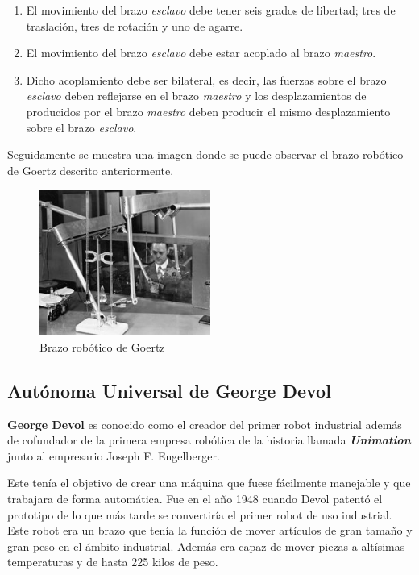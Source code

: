 \begin{enumerate}
\item El movimiento del brazo \textit{esclavo} debe tener seis grados de libertad; tres de traslación, tres de rotación y uno de agarre.

\item El movimiento del brazo \textit{esclavo} debe estar acoplado al brazo \textit{maestro}.

\item Dicho acoplamiento debe ser bilateral, es decir, las fuerzas sobre el brazo \textit{esclavo} deben reflejarse en el brazo \textit{maestro} y los desplazamientos de producidos por el brazo \textit{maestro} deben producir el mismo desplazamiento sobre el brazo \textit{esclavo}.

\end{enumerate}


Seguidamente se muestra una imagen donde se puede observar el brazo robótico de Goertz descrito anteriormente.



\begin{figure}[H]
\begin{center}
  \includegraphics[width=0.5\textwidth]{./EtapaPrimeriza/imagenes/brazo.jpg}
  \caption{Brazo robótico de Goertz}
  \label{brazo}
\end{center}
\end{figure}


\subsection{Autónoma Universal de George Devol}

\textbf{George Devol} es conocido como el creador del primer robot industrial además de cofundador de la primera empresa robótica de la historia llamada \textit{\textbf{Unimation}} junto al empresario  Joseph F. Engelberger.

Este tenía el objetivo de crear una máquina que fuese fácilmente manejable y que trabajara de forma automática. Fue en el año 1948 cuando Devol patentó el prototipo de lo que más tarde se convertiría el primer robot de uso industrial. Este robot era un brazo que tenía la función de mover artículos de gran tamaño y gran peso en el ámbito industrial. Además era capaz de mover piezas a altísimas temperaturas y de hasta 225 kilos de peso.

